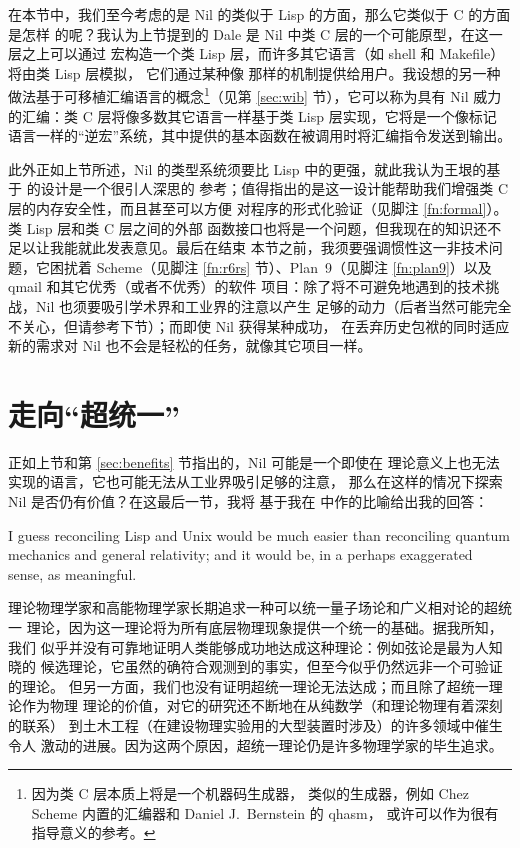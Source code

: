 在本节中，我们至今考虑的是 Nil 的类似于 Lisp 的方面，那么它类似于 C 的方面是怎样
的呢？我认为上节提到的 Dale 是 Nil 中类 C 层的一个可能原型，在这一层之上可以通过
宏构造一个类 Lisp 层，而许多其它语言（如 shell 和 Makefile）将由类 Lisp 层模拟，
它们通过某种像  那样的机制提供给用户。我设想的另一种
做法基于可移植汇编语言的概念\footnote{因为类 C 层本质上将是一个机器码生成器，
类似的生成器，例如 Chez Scheme 内置的汇编器和 Daniel J.\ Bernstein 的 qhasm，
或许可以作为很有指导意义的参考。}（见第 \ref{sec:wib} 节），它可以称为具有 Nil
威力的汇编：类 C 层将像多数其它语言一样基于类 Lisp 层实现，它将是一个像标记
语言一样的“逆宏”系统，其中提供的基本函数在被调用时将汇编指令发送到输出。

此外正如上节所述，Nil 的类型系统须要比 Lisp 中的更强，就此我认为王垠的基于%
的设计是一个很引人深思的
参考；值得指出的是这一设计能帮助我们增强类 C 层的内存安全性，而且甚至可以方便
对程序的形式化验证（见脚注 \ref{fn:formal}）。类 Lisp 层和类 C 层之间的外部
函数接口也将是一个问题，但我现在的知识还不足以让我能就此发表意见。最后在结束
本节之前，我须要强调惯性这一非技术问题，它困扰着 Scheme（见脚注 \ref{fn:r6rs}
节）、Plan~9（见脚注 \ref{fn:plan9}）以及 qmail 和其它优秀（或者不优秀）的软件
项目：除了将不可避免地遇到的技术挑战，Nil 也须要吸引学术界和工业界的注意以产生
足够的动力（后者当然可能完全不关心，但请参考下节）；而即使 Nil 获得某种成功，
在丢弃历史包袱的同时适应新的需求对 Nil 也不会是轻松的任务，就像其它项目一样。

\section{走向“超统一”}\label{sec:toe}

正如上节和第 \ref{sec:benefits} 节指出的，Nil 可能是一个即使在
理论意义上也无法实现的语言，它也可能无法从工业界吸引足够的注意，
那么在这样的情况下探索 Nil 是否仍有价值？在这最后一节，我将
基于我在 \parencite{vector2018c} 中作的比喻给出我的回答：
\begin{quoting}
	I guess reconciling Lisp and Unix would be much easier than
	reconciling quantum mechanics and general relativity; and
	it would be, in a perhaps exaggerated sense, as meaningful.
\end{quoting}

理论物理学家和高能物理学家长期追求一种可以统一量子场论和广义相对论的超统一
理论，因为这一理论将为所有底层物理现象提供一个统一的基础。据我所知，我们
似乎并没有可靠地证明人类能够成功地达成这种理论：例如弦论是最为人知晓的
候选理论，它虽然的确符合观测到的事实，但至今似乎仍然远非一个可验证的理论。
但另一方面，我们也没有证明超统一理论无法达成；而且除了超统一理论作为物理
理论的价值，对它的研究还不断地在从纯数学（和理论物理有着深刻的联系）
到土木工程（在建设物理实验用的大型装置时涉及）的许多领域中催生令人
激动的进展。因为这两个原因，超统一理论仍是许多物理学家的毕生追求。

